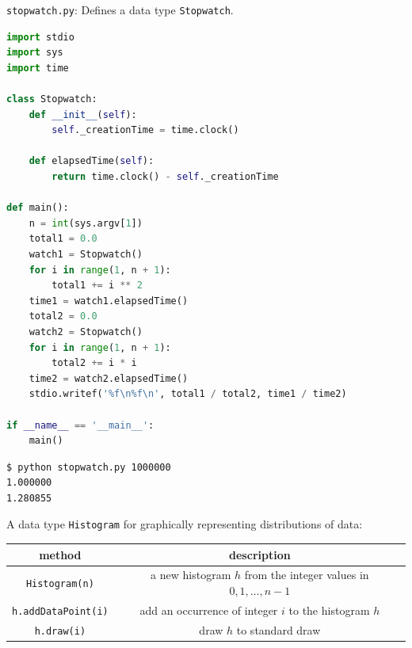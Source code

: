 \documentclass[8pt,a4paper,compress,handout]{beamer}
\begin{document}
\begin{frame}[fragile]
\begin{framed}
\tiny \lstinline{stopwatch.py}: Defines a data type \lstinline{Stopwatch}. 
\end{framed}

\begin{lstlisting}[language=Python]
import stdio
import sys
import time

class Stopwatch:
    def __init__(self):
        self._creationTime = time.clock()
    
    def elapsedTime(self):
        return time.clock() - self._creationTime

def main():
    n = int(sys.argv[1])
    total1 = 0.0
    watch1 = Stopwatch()
    for i in range(1, n + 1):
        total1 += i ** 2
    time1 = watch1.elapsedTime()    
    total2 = 0.0
    watch2 = Stopwatch()
    for i in range(1, n + 1):
        total2 += i * i
    time2 = watch2.elapsedTime()    
    stdio.writef('%f\n%f\n', total1 / total2, time1 / time2)

if __name__ == '__main__':
    main()
\end{lstlisting}

\begin{lstlisting}[language={}]
$ python stopwatch.py 1000000
1.000000
1.280855
\end{lstlisting}
\end{frame}

\begin{frame}[fragile]
A data type \lstinline{Histogram} for graphically representing distributions of data:
\begin{center}
\begin{tabular}{cc}
method & description \\ \hline
\lstinline$Histogram(n)$ & a new histogram $h$ from the integer values in $0, 1, \dots, n-1$ \\
\lstinline$h.addDataPoint(i)$ & add an occurrence of integer $i$ to the histogram $h$ \\
\lstinline$h.draw(i)$ & draw $h$ to standard draw
\end{tabular} 
\end{center}
\end{frame}
\end{document}
